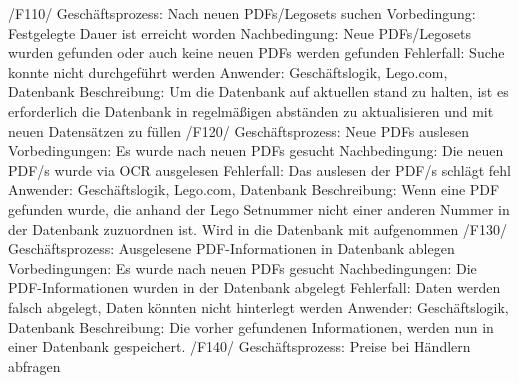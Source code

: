 /F110/ \newline
Geschäftsprozess: Nach neuen PDFs/Legosets suchen \newline
Vorbedingung: Festgelegte Dauer ist erreicht worden \newline
Nachbedingung: Neue PDFs/Legosets wurden gefunden oder auch keine neuen PDFs werden gefunden \newline
Fehlerfall: Suche konnte nicht durchgeführt werden \newline
Anwender: Geschäftslogik, Lego.com, Datenbank \newline
Beschreibung: Um die Datenbank auf aktuellen stand zu halten, ist es erforderlich die Datenbank in regelmäßigen abständen zu aktualisieren und mit neuen Datensätzen zu füllen \newline \newline
/F120/ \newline
Geschäftsprozess: Neue PDFs auslesen \newline
Vorbedingungen: Es wurde nach neuen PDFs gesucht \newline
Nachbedingung: Die neuen PDF/s wurde via OCR ausgelesen \newline
Fehlerfall: Das auslesen der PDF/s schlägt fehl \newline
Anwender: Geschäftslogik, Lego.com, Datenbank \newline
Beschreibung: Wenn eine PDF gefunden wurde, die anhand der Lego Setnummer nicht einer anderen Nummer in der Datenbank zuzuordnen ist. Wird in die Datenbank mit aufgenommen \newline \newline
/F130/ \newline
Geschäftsprozess: Ausgelesene PDF-Informationen in Datenbank ablegen \newline
Vorbedingungen: Es wurde nach neuen PDFs gesucht \newline
Nachbedingungen: Die PDF-Informationen wurden in der Datenbank abgelegt \newline
Fehlerfall: Daten werden falsch abgelegt, Daten könnten nicht hinterlegt werden \newline
Anwender: Geschäftslogik, Datenbank \newline
Beschreibung: Die vorher gefundenen Informationen, werden nun in einer Datenbank gespeichert. \newline \newline
/F140/ \newline
Geschäftsprozess: Preise bei Händlern abfragen \newline
